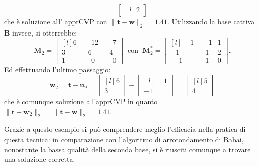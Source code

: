 \begin{exmp}
\begin{equation*}
\begin{bmatrix*}[l]
        2
    \end{bmatrix*}
\end{equation*}
che è soluzione all' apprCVP con $\|\mathbf{t}-\mathbf{w}\|_2=1.41$.
Utilizzando la base cattiva $\mathbf{B}$ invece, si otterrebbe:
\begin{equation*}
    \mathbf{M}_2 =
    \begin{bmatrix*}[l]
        6 & \phantom{-}12 & \phantom{-}7\\
        3 & -6           & -4\\
        1 & \phantom{-}0 & \phantom{-}0
    \end{bmatrix*}
    \ \text{ con } \
    \mathbf{M}_2^* =
    \begin{bmatrix*}[l]
        \phantom{-}1 & \phantom{-}1 & 1\\
        -1           & -1           & 2\\
        \phantom{-}1 & -1           & 0
    \end{bmatrix*}.
\end{equation*}
Ed effettuando l'ultimo passaggio:
\begin{equation*}
    \mathbf{w}_2 = \mathbf{t} - \mathbf{u}_2 =
    \begin{bmatrix*}[l]
        6 \\
        3
    \end{bmatrix*}
    -
    \begin{bmatrix*}[l]
        \phantom{-}1 \\
        -1
    \end{bmatrix*}
    =
    \begin{bmatrix*}[l]
        5 \\
        4
    \end{bmatrix*}
\end{equation*}
che è comunque soluzione all'apprCVP in quanto 
$\|\mathbf{t}-\mathbf{w}_2\|_2=\|\mathbf{t}-\mathbf{w}\|_2=1.41$.
\end{exmp}
Grazie a questo esempio si può comprendere meglio l'efficacia nella pratica di questa tecnica:
in comparazione con l'algoritmo di arrotondamento di Babai, nonostante la bassa qualità
della seconda base, si è riusciti comunque a trovare una soluzione corretta.



